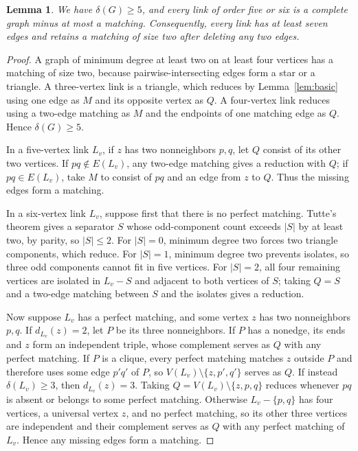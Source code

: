\documentclass[11pt]{article}
\newtheorem{lemma}[theorem]{Lemma}
\begin{document}
\begin{lemma}\label{lem:small-links}
We have $\delta(G)\geq 5$, and every link of order five or six is a complete graph minus at most a matching. Consequently, every link has at least seven edges and retains a matching of size two after deleting any two edges.
\end{lemma}

\begin{proof}
A graph of minimum degree at least two on at least four vertices has a matching of size two, because pairwise-intersecting edges form a star or a triangle. A three-vertex link is a triangle, which reduces by Lemma~\ref{lem:basic} using one edge as $M$ and its opposite vertex as $Q$. A four-vertex link reduces using a two-edge matching as $M$ and the endpoints of one matching edge as $Q$. Hence $\delta(G)\geq 5$.

In a five-vertex link $L_v$, if $z$ has two nonneighbors $p,q$, let $Q$ consist of its other two vertices. If $pq\notin E(L_v)$, any two-edge matching gives a reduction with $Q$; if $pq\in E(L_v)$, take $M$ to consist of $pq$ and an edge from $z$ to $Q$. Thus the missing edges form a matching.

In a six-vertex link $L_v$, suppose first that there is no perfect matching. Tutte's theorem gives a separator $S$ whose odd-component count exceeds $|S|$ by at least two, by parity, so $|S|\leq 2$. For $|S|=0$, minimum degree two forces two triangle components, which reduce. For $|S|=1$, minimum degree two prevents isolates, so three odd components cannot fit in five vertices. For $|S|=2$, all four remaining vertices are isolated in $L_v-S$ and adjacent to both vertices of $S$; taking $Q=S$ and a two-edge matching between $S$ and the isolates gives a reduction.

Now suppose $L_v$ has a perfect matching, and some vertex $z$ has two nonneighbors $p,q$. If $d_{L_v}(z)=2$, let $P$ be its three nonneighbors. If $P$ has a nonedge, its ends and $z$ form an independent triple, whose complement serves as $Q$ with any perfect matching. If $P$ is a clique, every perfect matching matches $z$ outside $P$ and therefore uses some edge $p'q'$ of $P$, so $V(L_v)\setminus\{z,p',q'\}$ serves as $Q$. If instead $\delta(L_v)\geq 3$, then $d_{L_v}(z)=3$. Taking $Q=V(L_v)\setminus\{z,p,q\}$ reduces whenever $pq$ is absent or belongs to some perfect matching. Otherwise $L_v-\{p,q\}$ has four vertices, a universal vertex $z$, and no perfect matching, so its other three vertices are independent and their complement serves as $Q$ with any perfect matching of $L_v$. Hence any missing edges form a matching.


\end{proof}
\end{document}

